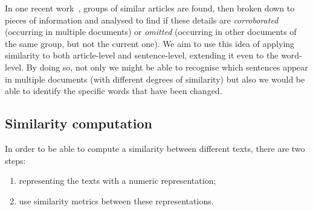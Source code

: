 


In one recent work~\cite{bountouridis2018explaining}, groups of similar articles are found, then broken down to pieces of information and analysed to find if these details are \emph{corroborated} (occurring in multiple documents) or \emph{omitted} (occurring in other documents of the same group, but not the current one). 
We aim to use this idea of applying similarity to both article-level and sentence-level, extending it even to the word-level. By doing so,
not only we might be able to recognise which sentences appear in multiple documents (with different degrees of similarity) but also we would be able to identify the specific words that have been changed.





\subsection{Similarity computation}
In order to be able to compute a similarity between different texts, there are two steps: %

\begin{enumerate}
    \item representing the texts with a numeric representation;
    \item use similarity metrics between these representations.
\end{enumerate}

